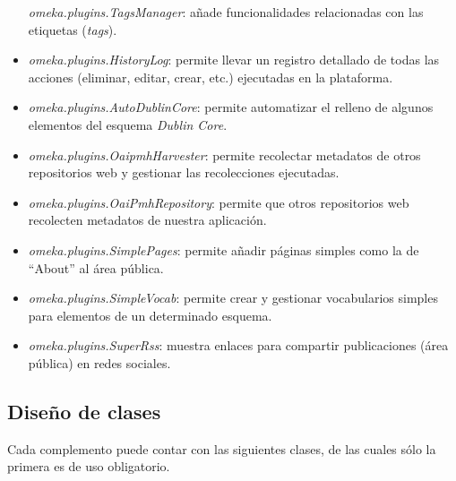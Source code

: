 \begin{itemize}
  \emph{omeka.plugins.TagsManager}: añade funcionalidades relacionadas
  con las etiquetas (\emph{tags}).
\item
  \emph{omeka.plugins.HistoryLog}: permite llevar un registro detallado
  de todas las acciones (eliminar, editar, crear, etc.) ejecutadas en la
  plataforma.
\item
  \emph{omeka.plugins.AutoDublinCore}: permite automatizar el relleno de
  algunos elementos del esquema \emph{Dublin Core}.
\item
  \emph{omeka.plugins.OaipmhHarvester}: permite recolectar metadatos de
  otros repositorios web y gestionar las recolecciones ejecutadas.
\item
  \emph{omeka.plugins.OaiPmhRepository}: permite que otros repositorios
  web recolecten metadatos de nuestra aplicación.
\item
  \emph{omeka.plugins.SimplePages}: permite añadir páginas simples como
  la de ``About'' al área pública.
\item
  \emph{omeka.plugins.SimpleVocab}: permite crear y gestionar
  vocabularios simples para elementos de un determinado esquema.
\item
  \emph{omeka.plugins.SuperRss}: muestra enlaces para compartir
  publicaciones (área pública) en redes sociales.
\end{itemize}

\subsection{Diseño de clases}

Cada complemento puede contar con las siguientes clases, de las cuales
sólo la primera es de uso obligatorio.

